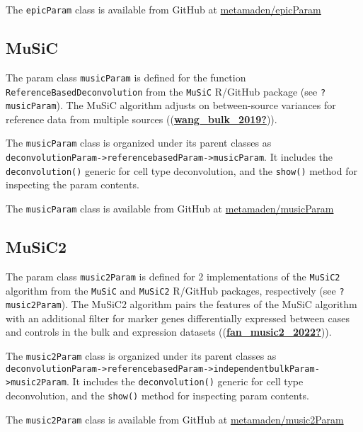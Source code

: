 \documentclass[]{article}
\begin{document}
The \texttt{epicParam} class is available from GitHub at
\href{https://github.com/metamaden/epicParam}{metamaden/epicParam}

\hypertarget{music}{%
\subsection{MuSiC}\label{music}}

The param class \texttt{musicParam} is defined for the function
\texttt{ReferenceBasedDeconvolution} from the \texttt{MuSiC} R/GitHub package (see
\texttt{?musicParam}). The MuSiC algorithm adjusts on between-source variances for
reference data from multiple sources ((\protect\hyperlink{ref-wang_bulk_2019}{\textbf{wang\_bulk\_2019?}})).

The \texttt{musicParam} class is organized under its parent classes as
\texttt{deconvolutionParam-\textgreater{}referencebasedParam-\textgreater{}musicParam}. It includes the
\texttt{deconvolution()} generic for cell type deconvolution, and the \texttt{show()} method
for inspecting the param contents.

The \texttt{musicParam} class is available from GitHub at \href{https://github.com/metamaden/musicParam}{metamaden/musicParam}

\hypertarget{music2}{%
\subsection{MuSiC2}\label{music2}}

The param class \texttt{music2Param} is defined for 2 implementations of the \texttt{MuSiC2}
algorithm from the \texttt{MuSiC} and \texttt{MuSiC2} R/GitHub packages, respectively (see
\texttt{?music2Param}). The MuSiC2 algorithm pairs the features of the MuSiC algorithm
with an additional filter for marker genes differentially expressed between
cases and controls in the bulk and expression datasets ((\protect\hyperlink{ref-fan_music2_2022}{\textbf{fan\_music2\_2022?}})).

The \texttt{music2Param} class is organized under its parent classes as
\texttt{deconvolutionParam-\textgreater{}referencebasedParam-\textgreater{}independentbulkParam-\textgreater{}music2Param}.
It includes the \texttt{deconvolution()} generic for cell type deconvolution, and the
\texttt{show()} method for inspecting param contents.

The \texttt{music2Param} class is available from GitHub at \href{https://github.com/metamaden/music2Param}{metamaden/music2Param}
\end{document}

